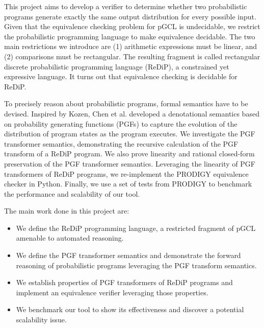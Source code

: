 \documentclass[a4paper]{article}
\begin{document}
This project aims to develop a verifier to determine whether two probabilistic programs generate exactly the same output distribution for every possible input.
Given that the equivalence checking problem for pGCL is undecidable, we restrict the probabilistic programming language to make equivalence decidable.
The two main restrictions we introduce are (1) arithmetic expressions must be linear, and (2) comparisons must be rectangular.
The resulting fragment is called rectangular discrete probabilistic programming language (ReDiP), a constrained yet expressive language.
It turns out that equivalence checking is decidable for ReDiP.\par
To precisely reason about probabilistic programs, formal semantics have to be devised.
Inspired by Kozen\cite{kozen1979semantics}, Chen et al.\cite{cav-pgf} developed a denotational semantics based on probability generating functions (PGFs) to capture the evolution of the distribution of program states as the program executes.
We investigate the PGF transformer semantics, demonstrating the recursive calculation of the PGF transform of a ReDiP program.
We also prove linearity and rational closed-form preservation of the PGF transformer semantics. Leveraging the linearity of PGF transformers of ReDiP programs, we re-implement the PRODIGY equivalence checker in Python.
Finally, we use a set of tests from PRODIGY\cite{cav-extended} to benchmark the performance and scalability of our tool.\par

The main work done in this project are:

\begin{itemize}
	\item We define the ReDiP programming language, a restricted fragment of pGCL amenable to automated reasoning.
	\item We define the PGF transformer semantics and demonstrate the forward reasoning of probabilistic programs leveraging the PGF transform semantics.
	\item We establish properties of PGF transformers of ReDiP programs and implement an equivalence verifier leveraging those properties.
	\item We benchmark our tool to show its effectiveness and discover a potential scalability issue.
\end{itemize}
\end{document}
